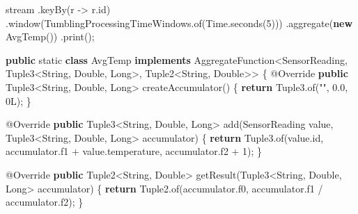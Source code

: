 \documentclass[cn,11pt,chinese]{elegantbook}
\newenvironment{Shaded}{}{}
\newcommand{\AttributeTok}[1]{\textcolor[rgb]{0.49,0.56,0.16}{#1}}
\newcommand{\BuiltInTok}[1]{#1}
\newcommand{\DataTypeTok}[1]{\textcolor[rgb]{0.56,0.13,0.00}{#1}}
\newcommand{\DecValTok}[1]{\textcolor[rgb]{0.25,0.63,0.44}{#1}}
\newcommand{\FloatTok}[1]{\textcolor[rgb]{0.25,0.63,0.44}{#1}}
\newcommand{\FunctionTok}[1]{\textcolor[rgb]{0.02,0.16,0.49}{#1}}
\newcommand{\KeywordTok}[1]{\textcolor[rgb]{0.00,0.44,0.13}{\textbf{#1}}}
\newcommand{\NormalTok}[1]{#1}
\newcommand{\StringTok}[1]{\textcolor[rgb]{0.25,0.44,0.63}{#1}}
\begin{document}
\begin{Shaded}
\begin{Highlighting}[]
\NormalTok{stream}
\NormalTok{    .}\FunctionTok{keyBy}\NormalTok{(r {-}\textgreater{} r.}\FunctionTok{id}\NormalTok{)}
\NormalTok{    .}\FunctionTok{window}\NormalTok{(TumblingProcessingTimeWindows.}\FunctionTok{of}\NormalTok{(}\BuiltInTok{Time}\NormalTok{.}\FunctionTok{seconds}\NormalTok{(}\DecValTok{5}\NormalTok{)))}
\NormalTok{    .}\FunctionTok{aggregate}\NormalTok{(}\KeywordTok{new} \FunctionTok{AvgTemp}\NormalTok{())}
\NormalTok{    .}\FunctionTok{print}\NormalTok{();}

\KeywordTok{public} \DataTypeTok{static} \KeywordTok{class}\NormalTok{ AvgTemp }\KeywordTok{implements}\NormalTok{ AggregateFunction\textless{}SensorReading, Tuple3\textless{}}\BuiltInTok{String}\NormalTok{, }\BuiltInTok{Double}\NormalTok{, }\BuiltInTok{Long}\NormalTok{\textgreater{}, Tuple2\textless{}}\BuiltInTok{String}\NormalTok{, }\BuiltInTok{Double}\NormalTok{\textgreater{}\textgreater{} \{}
    \AttributeTok{@Override}
    \KeywordTok{public}\NormalTok{ Tuple3\textless{}}\BuiltInTok{String}\NormalTok{, }\BuiltInTok{Double}\NormalTok{, }\BuiltInTok{Long}\NormalTok{\textgreater{} }\FunctionTok{createAccumulator}\NormalTok{() \{}
        \KeywordTok{return}\NormalTok{ Tuple3.}\FunctionTok{of}\NormalTok{(}\StringTok{""}\NormalTok{, }\FloatTok{0.}\DecValTok{0}\NormalTok{, }\DecValTok{0L}\NormalTok{);}
\NormalTok{    \}}

    \AttributeTok{@Override}
    \KeywordTok{public}\NormalTok{ Tuple3\textless{}}\BuiltInTok{String}\NormalTok{, }\BuiltInTok{Double}\NormalTok{, }\BuiltInTok{Long}\NormalTok{\textgreater{} }\FunctionTok{add}\NormalTok{(SensorReading value, Tuple3\textless{}}\BuiltInTok{String}\NormalTok{, }\BuiltInTok{Double}\NormalTok{, }\BuiltInTok{Long}\NormalTok{\textgreater{} accumulator) \{}
        \KeywordTok{return}\NormalTok{ Tuple3.}\FunctionTok{of}\NormalTok{(value.}\FunctionTok{id}\NormalTok{, accumulator.}\FunctionTok{f1}\NormalTok{ + value.}\FunctionTok{temperature}\NormalTok{, accumulator.}\FunctionTok{f2}\NormalTok{ + }\DecValTok{1}\NormalTok{);}
\NormalTok{    \}}

    \AttributeTok{@Override}
    \KeywordTok{public}\NormalTok{ Tuple2\textless{}}\BuiltInTok{String}\NormalTok{, }\BuiltInTok{Double}\NormalTok{\textgreater{} }\FunctionTok{getResult}\NormalTok{(Tuple3\textless{}}\BuiltInTok{String}\NormalTok{, }\BuiltInTok{Double}\NormalTok{, }\BuiltInTok{Long}\NormalTok{\textgreater{} accumulator) \{}
        \KeywordTok{return}\NormalTok{ Tuple2.}\FunctionTok{of}\NormalTok{(accumulator.}\FunctionTok{f0}\NormalTok{, accumulator.}\FunctionTok{f1}\NormalTok{ / accumulator.}\FunctionTok{f2}\NormalTok{);}
\NormalTok{    \}}


\end{Highlighting}
\end{Shaded}
\end{document}
